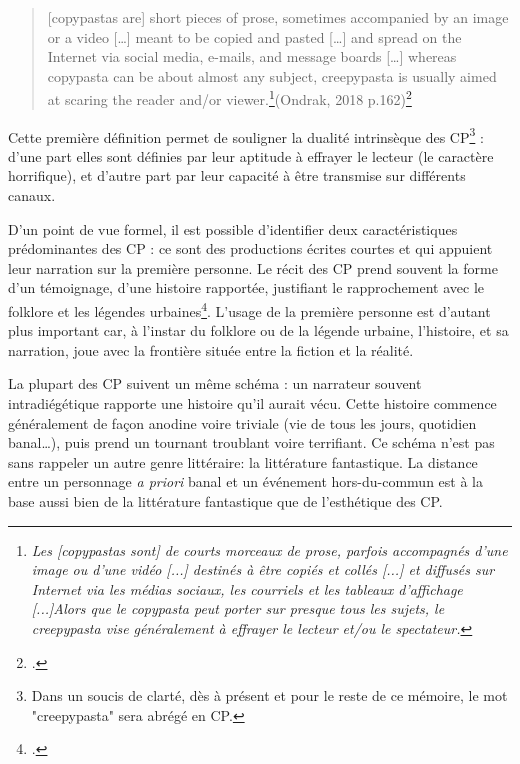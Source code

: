 \documentclass[12pt,a4paper,oneside,titlepage]{book} %
\begin{document}
	
	
	\begin{quotation}
		[copypastas are] short pieces of prose, sometimes accompanied by an image or a video […] meant to be copied
		and pasted […] and spread on the Internet via social media, e-mails, and message boards […]
		whereas copypasta can be about almost any subject, creepypasta is usually aimed at scaring
		the reader and/or viewer.\footnote{\emph{Les [copypastas sont] de courts morceaux de prose, parfois accompagnés d'une image ou d'une vidéo [...] destinés à être copiés et collés [...] et diffusés sur Internet via les médias sociaux, les courriels et les tableaux d'affichage [...]Alors que le copypasta peut porter sur presque tous les sujets, le creepypasta vise généralement à effrayer le lecteur et/ou le spectateur.}}(Ondrak, 2018 p.162)\footcite{ondrak_spectres_2018}
	\end{quotation}
	\par
	Cette première définition permet de souligner la dualité intrinsèque des CP\footnote{Dans un soucis de clarté, dès à présent et pour le reste de ce mémoire, le mot "creepypasta" sera abrégé en CP.} : d'une part elles sont définies par leur aptitude à effrayer le lecteur (le caractère horrifique), et d'autre part par leur capacité à être transmise sur différents canaux. \\
\par
D’un point de vue formel, il est possible d’identifier deux caractéristiques prédominantes des CP : ce sont des productions écrites courtes et qui appuient leur narration sur la première personne. Le récit des CP prend souvent la forme d’un témoignage, d’une histoire rapportée, justifiant le rapprochement avec le folklore et les légendes urbaines\footcite{blank_slender_2018}. L’usage de la première personne est d’autant plus important car, à l’instar du folklore ou de la légende urbaine, l’histoire, et sa narration, joue avec la frontière située entre la fiction et la réalité. 
\par
La plupart des CP suivent un même schéma : un narrateur souvent intradiégétique rapporte une histoire qu’il aurait vécu. Cette histoire commence généralement de façon anodine voire triviale (vie de tous les jours, quotidien banal…), puis prend un tournant troublant voire terrifiant. 
Ce schéma n’est pas sans rappeler un autre genre littéraire: la littérature fantastique. La distance entre un personnage \emph{a priori} banal et un événement hors-du-commun est à la base aussi bien de la littérature fantastique que de l’esthétique des CP. 
\end{document}
